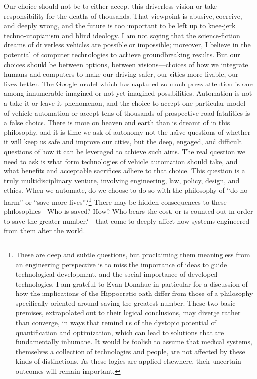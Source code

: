 Our choice should not be to either accept this driverless vision or take
responsibility for the deaths of thousands. That viewpoint is abusive, coercive,
and deeply wrong, and the future is too important to be left up to
knee-jerk techno-utopianism and blind ideology. I am not saying that
the science-fiction dreams of 
driverless vehicles are possible or impossible; moreover, I believe in the
potential of computer technologies to achieve groundbreaking results.
But our choices should be between options, between
visions---choices of how we integrate humans and computers to make our
driving safer, our cities more livable, our lives better. The Google model which has
captured so much press attention is one among innumerable imagined or
not-yet-imagined possibilities. Automation is not a
take-it-or-leave-it phenomenon, and the choice to accept one
particular model of vehicle automation or accept tens-of-thousands of
prospective road fatalities is a false choice. There is more on heaven
and earth than is dreamt of in this philosophy, and it is time we ask
of autonomy not the na\"{\i}ve questions of whether it will keep us
safe and improve our cities, but the deep, engaged, and difficult
questions of how it can be leveraged to achieve such aims. The real
question we need to ask is what form technologies of vehicle automation 
should take, and what benefits and acceptable sacrifices adhere to
that choice. This question is a truly multidisciplinary venture,
involving engineering, law, policy, design, and ethics. When we
automate, do we choose to do so with the philosophy of ``do no harm''
or ``save more lives''?\footnote{These are deep and subtle questions,
  but proclaiming them meaningless from an engineering perspective is
  to miss the importance of ideas to guide technological development,
  and the social importance of developed technologies. I am grateful
  to Evan Donahue in particular for a discussion of how the
  implications of the Hippocratic oath differ from those of a
  philosophy specifically oriented around saving the greatest number.
  These two basic premises, extrapolated out to their logical
  conclusions, may diverge rather than converge, in ways that remind
  us of the dystopic potential of quantification and optimization,
  which can lead to solutions that are fundamentally inhumane. It
  would be foolish 
  to assume that medical systems, themselves a collection of
  technologies and people, are not affected by these kinds of
  distinctions. As these logics are applied elsewhere, their uncertain
  outcomes
  will remain important.} There may be hidden consequences to these 
philosophies---Who is saved? How? Who bears the cost, or is
counted out in order to save the greater number?---that come to deeply
affect how systems engineered from them alter the world.

